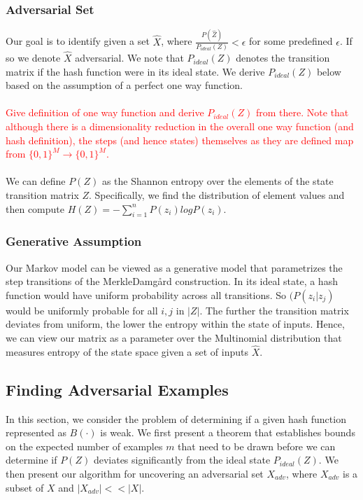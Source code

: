 \subsubsection{Adversarial Set}
Our goal is to identify given a set $\hat{X}$, where $\frac{P(\hat{Z})}{P_{ideal}(Z)} < \epsilon$ for some predefined $\epsilon$. If so we denote $\hat{X}$ adversarial. We note that $P_{ideal}(Z)$ denotes the transition matrix if the hash function were in its ideal state. We derive $P_{ideal}(Z)$ below based on the assumption of a perfect one way function.
\\
\\
\textcolor{red}{Give definition of one way function and derive $P_{ideal}(Z)$ from there. Note that although there is a dimensionality reduction in the overall one way function (and hash definition), the steps (and hence states) themselves as they are defined map from $\{0,1\}^{M} \rightarrow \{0,1\}^{M}$.} 
\\
\\
We can define $P(Z)$ as the Shannon entropy over the elements of the state transition matrix $Z$. Specifically, we find the distribution of element values and then compute $H(Z) = -\sum_{i=1}^{n} P(z_{i}) log P(z_{i})$.

\subsubsection{Generative Assumption}
Our Markov model can be viewed as a generative model that parametrizes the step transitions of the Merkle{\textendash}Damg\r{a}rd construction. In its ideal state, a hash function would have uniform probability across all transitions. So $(P(z_{i} | z_{j})$ would be uniformly probable for all $i,j$ in $|Z|$. The further the transition matrix deviates from uniform, the lower the entropy within the state of inputs. Hence, we can view our matrix as a parameter over the Multinomial distribution that measures entropy of the state space given a set of inputs $\hat{X}$.



\subsection{Finding Adversarial Examples}
In this section, we consider the problem of determining if a given hash function represented as $B(\cdot)$ is weak. We first present a theorem that establishes bounds on the expected number of examples $m$ that need to be drawn before we can determine if $P(Z)$ deviates significantly from the ideal state $P_{ideal}(Z)$. We then present our algorithm for uncovering an adversarial set $X_{adv}$, where $X_{adv}$ is a subset of $X$ and $|X_{adv}|  << |X|$. 

